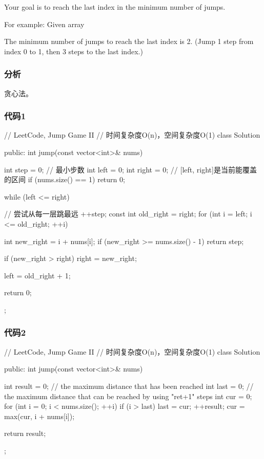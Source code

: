 Your goal is to reach the last index in the minimum number of jumps.

For example:
Given array 

The minimum number of jumps to reach the last index is 2. (Jump 1 step from index 0 to 1, then 3 steps to the last index.)


\subsubsection{分析}
贪心法。


\subsubsection{代码1}
\begin{Code}
// LeetCode, Jump Game II
// 时间复杂度O(n)，空间复杂度O(1)
class Solution {
public:
    int jump(const vector<int>& nums) {
        int step = 0; // 最小步数
        int left = 0;
        int right = 0;  // [left, right]是当前能覆盖的区间
        if (nums.size() == 1) return 0;

        while (left <= right) { // 尝试从每一层跳最远
            ++step;
            const int old_right = right;
            for (int i = left; i <= old_right; ++i) {
                int new_right = i + nums[i];
                if (new_right >= nums.size() - 1) return step;

                if (new_right > right) right = new_right;
            }
            left = old_right + 1;
        }
        return 0;
    }
};
\end{Code}


\subsubsection{代码2}
\begin{Code}
// LeetCode, Jump Game II
// 时间复杂度O(n)，空间复杂度O(1)
class Solution {
public:
    int jump(const vector<int>& nums) {
        int result = 0;
        // the maximum distance that has been reached
        int last = 0;
        // the maximum distance that can be reached by using "ret+1" steps
        int cur = 0;
        for (int i = 0; i < nums.size(); ++i) {
            if (i > last) {
                last = cur;
                ++result;
            }
            cur = max(cur, i + nums[i]);
        }

        return result;
    }
};
\end{Code}


